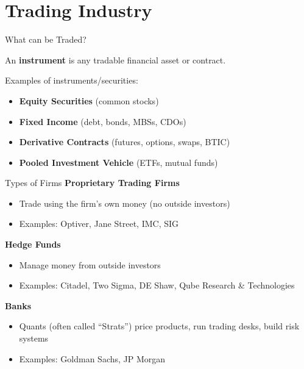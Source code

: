\section{Trading Industry}

\begin{frame}{What can be Traded?}
  \begin{sqt:definition}
    An \textbf{instrument} is any tradable financial asset or contract.
  \end{sqt:definition}
  \vspace{0.3cm}
  Examples of instruments/securities:
  \begin{itemize}
    \item \textbf{Equity Securities} (common stocks)
    \item \textbf{Fixed Income} (debt, bonds, MBSs, CDOs)
    \item \textbf{Derivative Contracts} (futures, options, swaps, BTIC)
    \item \textbf{Pooled Investment Vehicle} (ETFs, mutual funds)
  \end{itemize}
\end{frame}

\begin{frame}{Types of Firms}
  \textbf{Proprietary Trading Firms}
  \begin{itemize}
    \item Trade using the firm's own money (no outside investors)
    \item Examples: Optiver, Jane Street, IMC, SIG
  \end{itemize}

  \vspace{0.3cm}
  \textbf{Hedge Funds}
  \begin{itemize}
    \item Manage money from outside investors
    \item Examples: Citadel, Two Sigma, DE Shaw, Qube Research \& Technologies
  \end{itemize}

  \vspace{0.3cm}
  \textbf{Banks}
  \begin{itemize}
    \item Quants (often called ``Strats'') price products, run trading desks, build risk systems
    \item Examples: Goldman Sachs, JP Morgan
  \end{itemize}
\end{frame}

